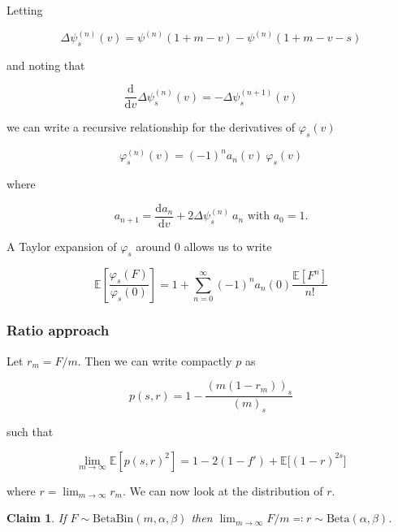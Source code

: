 \documentclass[american, abstract=on]{scrartcl}
\theoremstyle{plain}
\newtheorem{claim}{Claim}
\newcommand{\E}{\mathbb{E}}
\newcommand{\Beta}{\text{Beta}}
\newcommand{\Bin}{\text{Bin}}
\begin{document}
Letting

\begin{equation}
    \Delta \psi^{(n)}_s(v) = \psi^{(n)}(1 + m - v) - \psi^{(n)}(1 + m - v - s)
\end{equation}

and noting that

\begin{equation}
    \frac{\text{d}}{\text{d}v} \Delta \psi^{(n)}_s(v) = -\Delta \psi^{(n + 1)}_s(v)
\end{equation}

we can write a recursive relationship for the derivatives of $\varphi_s(v)$

\begin{equation}
    \varphi_s^{(n)}(v) = (-1)^n a_{n}(v) \ \varphi_s(v)
\end{equation}

where

\begin{equation}
    a_{n+1} = \frac{\text{d}a_n}{\text{d}v} + 2 \Delta \psi^{(n)}_s \ a_n \text{ with } a_{0} = 1.
\end{equation}  

A Taylor expansion of $\varphi_s$ around $0$ allows us to write

\begin{equation}
    \E\left[\frac{\varphi_s(F)}{\varphi_s(0)}\right] = 1 + \sum^{\infty}_{n = 0} (-1)^n a_{n}(0) \frac{\E[F^n]}{n!}
\end{equation}

\subsubsection{Ratio approach}

Let $r_m = F / m$. Then we can write compactly $p$ as

\begin{equation}
    p(s, r) = 1 - \frac{(m(1- r_m))_s}{(m)_s}
\end{equation}

such that

\begin{equation}
   \lim_{m \rightarrow \infty} \E \left[p(s, r)^2\right] = 1 - 2(1 - f') + \E\big[(1 - r)^{2s}\big]
\end{equation}

where $r = \lim_{m \rightarrow \infty} r_m$. We can now look at the distribution of $r$.

\begin{claim}
    If $F \sim \Beta\Bin(m, \alpha, \beta)$ then $\lim_{m \rightarrow \infty} F / m \eqqcolon r \sim \Beta(\alpha, \beta)$.
\end{claim}
\end{document}
